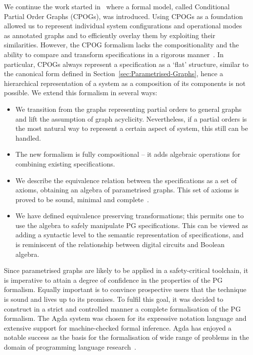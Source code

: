 
We continue the work started in~\cite{2010_mokhov_ieee}
where a formal model, called Conditional Partial Order Graphs (CPOGs),
was introduced. Using CPOGs as a foundation allowed us to represent individual system configurations
and operational modes as annotated graphs and to efficiently overlay them by exploiting
their similarities. However, the CPOG formalism lacks the compositionality
and the ability to compare and transform specifications in a rigorous
manner~\cite{pg_algebra}. In particular, CPOGs always represent a specification as
a `flat' structure, similar to the canonical form defined in Section~\ref{sec:Parametrised-Graphs},
hence a hierarchical representation of a system as a composition of
its components is not possible. We extend this formalism in several
ways:

\begin{itemize}
\item We transition from the graphs representing partial orders to general graphs and lift the assumption of graph acyclicity.
Nevertheless, if a partial orders is the most natural way to represent
a certain aspect of system, this still can be handled. 
\item The new formalism is fully compositional -- it adds algebraic operations for combining existing specifications.
\item We describe the equivalence relation between the specifications as
a set of axioms, obtaining an algebra of parametrised graphs. This set of axioms is proved
to be sound, minimal and complete~\cite{pg_algebra}.
\item We have defined equivalence preserving transformations; this permits one to use the algebra to safely manipulate PG specifications. 
This can be viewed as adding a syntactic level to the semantic representation
of specifications, and is reminiscent of the relationship between digital
circuits and Boolean algebra.
\end{itemize}

Since parametrised graphs are likely to be applied in a safety-critical toolchain, it is imperative to attain a degree of confidence in the properties of the PG formalism. Equally important is to convince prospective users that the technique is sound and lives up to its promises. To fulfil this goal, it was decided to construct in a strict and controlled manner a complete formalisation of the PG formalism. The Agda system \cite{norell:thesis} was chosen for its expressive notation language and extensive support for machine-checked formal inference. Agda has enjoyed a notable success as the basis for the formalisation of wide range of problems in the domain of programming language research~\cite{LTL-types-FRP,indexed-containers}.

